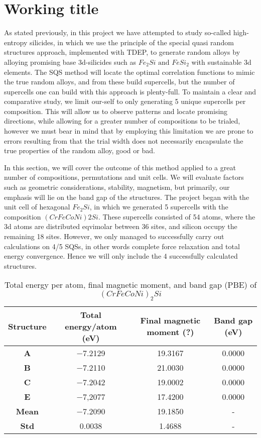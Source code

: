 \chapter{Working title}
\label{sec:something}


As stated previously, in this project we have attempted to study so-called high-entropy silicides, in which we use the principle of the special quasi random structures approach, implemented with TDEP, to generate random alloys by alloying promising base 3d-silicides such as $Fe_2Si \text{ and }FeSi_2$ with sustainable 3d elements. The SQS method will locate the optimal correlation functions to mimic the true random alloys, and from these build supercells, but the number of supercells one can build with this approach is plenty-full. To maintain a clear and comparative study, we limit our-self to only generating 5 unique supercells per composition. This will allow us to observe patterns and locate promising directions, while allowing for a greater number of compositions to be trialed, however we must bear in mind that by employing this limitation we are prone to errors resulting from that the trial width does not necessarily encapsulate the true properties of the random alloy, good or bad. 

In this section, we will cover the outcome of this method applied to a great number of compositions, permutations and unit cells. We will evaluate factors such as geometric considerations, stability, magnetism, but primarily, our emphasis will lie on the band gap of the structures. The project began with the unit cell of hexagonal $Fe_2Si$, in which we generated 5 supercells with the composition $(CrFeCoNi)2Si$. These supercells consisted of 54 atoms, where the 3d atoms are distributed eqvimolar between 36 sites, and silicon occupy the remaining 18 sites. However, we only managed to successfully carry out calculations on 4/5 SQSs, in other words complete force relaxation and total energy convergence. Hence we will only include the 4 successfully calculated structures.  


\begin{table}[H]
\centering
\begin{tabular}{@{}cccc@{}}
\toprule
Structure  & Total energy/atom (eV) & Final magnetic moment (?) & Band gap (eV) \\ \midrule
\textbf{A} & −7.2129                & 19.3167                    & 0.0000        \\
\textbf{B} & −7.2110                & 21.0030                    & 0.0000        \\
\textbf{C} & −7.2042                & 19.0002                    & 0.0000        \\
\textbf{E} & −7,2077                & 17.4200                    & 0.0000             \\
\textbf{Mean} & −7.2090            & 19.1850                  	 & -        \\ 
\textbf{Std} & 0.0038				  & 	1.4688						& -				\\ \bottomrule
\end{tabular}
\caption{Total energy per atom, final magnetic moment, and band gap (PBE) of $(CrFeCoNi)_2Si$  }
\label{table:fesi2_summary}
\end{table}  

